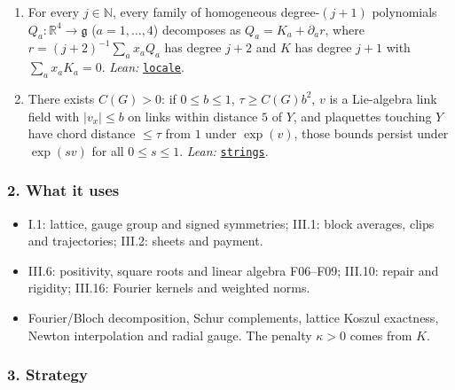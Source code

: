 \documentclass[
  letterpaper,
  11pt]{article}
\providecommand{\tightlist}{%
  \setlength{\itemsep}{0pt}\setlength{\parskip}{0pt}}
\begin{document}
\begin{enumerate}
  \href{https://github.com/yang-mills-group/OpenAI-YM-20261028/blob/3456e5e75cf8d4cd558955a5c7638fba2d68f464/YM/MultiNext/SIGNED_SOURCE_CONTINUATION/PMOM.lean\#L43-L61}{\texttt{wiped}}.
\item
  For every \(j\in\mathbb N\), every family of homogeneous
  degree-\((j+1)\) polynomials \(Q_a:\mathbb R^4\to\mathfrak g\)
  (\(a=1,\ldots,4\)) decomposes as \(Q_a=K_a+\partial_ar\), where
  \(r=(j+2)^{-1}\sum_ax_aQ_a\) has degree \(j+2\) and \(K\) has degree
  \(j+1\) with \(\sum_ax_aK_a=0\). \emph{Lean:}
  \href{https://github.com/yang-mills-group/OpenAI-YM-20261028/blob/3456e5e75cf8d4cd558955a5c7638fba2d68f464/YM/MultiNext/SIGNED_SOURCE_CONTINUATION/Averaging.lean\#L84-L114}{\texttt{locale}}.
\item
  There exists \(C(G)>0\): if \(0\le b\le1\), \(\tau\ge C(G)b^2\), \(v\)
  is a Lie-algebra link field with \(|v_x|\le b\) on links within
  distance \(5\) of \(Y\), and plaquettes touching \(Y\) have chord
  distance \(\le\tau\) from \(1\) under \(\exp(v)\), those bounds
  persist under \(\exp(sv)\) for all \(0\le s\le1\). \emph{Lean:}
  \href{https://github.com/yang-mills-group/OpenAI-YM-20261028/blob/3456e5e75cf8d4cd558955a5c7638fba2d68f464/YM/MultiNext/SIGNED_SOURCE_CONTINUATION/Safeguard.lean\#L148-L177}{\texttt{strings}}.
\end{enumerate}

\subsubsection{2. What it uses}\label{what-it-uses-5}

\begin{itemize}
\tightlist
\item
  I.1: lattice, gauge group and signed symmetries; III.1: block
  averages, clips and trajectories; III.2: sheets and payment.
\item
  III.6: positivity, square roots and linear algebra F06--F09; III.10:
  repair and rigidity; III.16: Fourier kernels and weighted norms.
\item
  Fourier/Bloch decomposition, Schur complements, lattice Koszul
  exactness, Newton interpolation and radial gauge. The penalty
  \(\kappa>0\) comes from \(K\).
\end{itemize}

\subsubsection{3. Strategy}\label{strategy-5}
\end{document}

